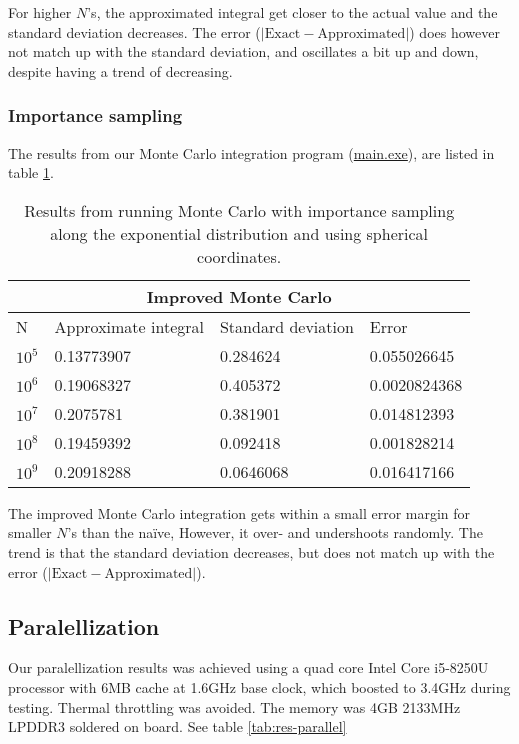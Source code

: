 \documentclass[../main.tex]{subfiles}
\begin{document}
For higher $N$'s, the approximated integral get closer to the actual value and the standard deviation decreases. The error ($|\text{Exact}-\text{Approximated}|$) does however not match up with the standard deviation, and oscillates a bit up and down, despite having a trend of decreasing.

\subsubsection{Importance sampling}
The results from our Monte Carlo integration program (\href{https://github.com/kmaasrud/Project-3/blob/master/code/Monte-Carlo/main.exe}{main.exe}), are listed in table \ref{tab:res-impsamp}.

\begin{table}[h!]
  \begin{center}
    \begin{tabular}{|p{1cm}|p{3.5cm}|p{3cm}|p{3cm}|}
      \hline
      \multicolumn{4}{|c|}{\textbf{Improved Monte Carlo}} \\
      \hline
      N   & Approximate integral & Standard deviation & Error\\
      \hline
      $10^5$ &  0.13773907 &  0.284624 & 0.055026645\\
      $10^6$ &  0.19068327 &  0.405372 & 0.0020824368\\
      $10^7$ &  0.2075781 &  0.381901  & 0.014812393\\
      $10^8$ &  0.19459392 &  0.092418  & 0.001828214\\
      $10^9$ &  0.20918288 &  0.0646068 & 0.016417166\\
      \hline
    \end{tabular}
    \caption{Results from running Monte Carlo with importance sampling along the exponential distribution and using spherical coordinates.}
    \label{tab:res-impsamp}
  \end{center}
\end{table}
\FloatBarrier
The improved Monte Carlo integration gets within a small error margin for smaller $N$'s than the naïve, However, it over- and undershoots randomly. The trend is that the standard deviation decreases, but does not match up with the error ($|\text{Exact}-\text{Approximated}|$).

\subsection{Paralellization} \label{sec:res-paralell}
Our paralellization results was achieved using a quad core Intel Core i5-8250U processor with 6MB cache at 1.6GHz base clock, which boosted to 3.4GHz during testing. Thermal throttling was avoided.
The memory was 4GB 2133MHz LPDDR3 soldered on board. See table \ref{tab:res-parallel}
\end{document}
